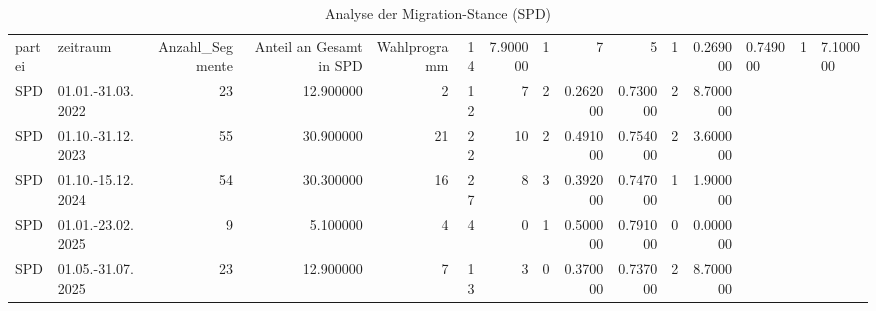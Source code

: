 \begin{table}
\caption{Analyse der Migration-Stance (SPD)}
\label{tab:meine_tabelle}
\begin{tabular}{llrrrrrrrrrr}
\toprule
partei & zeitraum & Anzahl_Segmente & Anteil an Gesamt in %
\midrule
SPD & Wahlprogramm & 14 & 7.900000 & 1 & 7 & 5 & 1 & 0.269000 & 0.749000 & 1 & 7.100000 \\
SPD & 01.01.-31.03.2022 & 23 & 12.900000 & 2 & 12 & 7 & 2 & 0.262000 & 0.730000 & 2 & 8.700000 \\
SPD & 01.10.-31.12.2023 & 55 & 30.900000 & 21 & 22 & 10 & 2 & 0.491000 & 0.754000 & 2 & 3.600000 \\
SPD & 01.10.-15.12.2024 & 54 & 30.300000 & 16 & 27 & 8 & 3 & 0.392000 & 0.747000 & 1 & 1.900000 \\
SPD & 01.01.-23.02.2025 & 9 & 5.100000 & 4 & 4 & 0 & 1 & 0.500000 & 0.791000 & 0 & 0.000000 \\
SPD & 01.05.-31.07.2025 & 23 & 12.900000 & 7 & 13 & 3 & 0 & 0.370000 & 0.737000 & 2 & 8.700000 \\
\bottomrule
\end{tabular}
\end{table}
